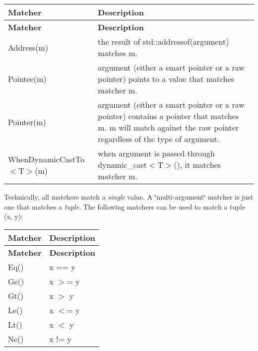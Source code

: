 \tabulinesep=1mm
\begin{longtabu} spread 0pt [c]{*{2}{|X[-1]}|}
\hline
\rowcolor{\tableheadbgcolor}\textbf{ Matcher  }&\textbf{ Description   }\\
\endfirsthead
\hline
\endfoot
\hline
\rowcolor{\tableheadbgcolor}\textbf{ Matcher  }&\textbf{ Description   }\\
\endhead
{\ttfamily Address(m)}  &the result of {\ttfamily std\+::addressof(argument)} matches {\ttfamily m}.   \\
{\ttfamily Pointee(m)}  &{\ttfamily argument} (either a smart pointer or a raw pointer) points to a value that matches matcher {\ttfamily m}.   \\
{\ttfamily Pointer(m)}  &{\ttfamily argument} (either a smart pointer or a raw pointer) contains a pointer that matches {\ttfamily m}. {\ttfamily m} will match against the raw pointer regardless of the type of {\ttfamily argument}.   \\
{\ttfamily When\+Dynamic\+Cast\+To$<$T$>$(m)}  &when {\ttfamily argument} is passed through {\ttfamily dynamic\+\_\+cast$<$T$>$()}, it matches matcher {\ttfamily m}.   \\
\end{longtabu}


Technically, all matchers match a {\itshape single} value. A \char`\"{}multi-\/argument\char`\"{} matcher is just one that matches a {\itshape tuple}. The following matchers can be used to match a tuple {\ttfamily (x, y)}\+:

\tabulinesep=1mm
\begin{longtabu} spread 0pt [c]{*{2}{|X[-1]}|}
\hline
\rowcolor{\tableheadbgcolor}\textbf{ Matcher  }&\textbf{ Description   }\\
\endfirsthead
\hline
\endfoot
\hline
\rowcolor{\tableheadbgcolor}\textbf{ Matcher  }&\textbf{ Description   }\\
\endhead
{\ttfamily Eq()}  &{\ttfamily x == y}   \\
{\ttfamily Ge()}  &{\ttfamily x $>$= y}   \\
{\ttfamily Gt()}  &{\ttfamily x $>$ y}   \\
{\ttfamily Le()}  &{\ttfamily x $<$= y}   \\
{\ttfamily Lt()}  &{\ttfamily x $<$ y}   \\
{\ttfamily Ne()}  &{\ttfamily x != y}   \\
\end{longtabu}


